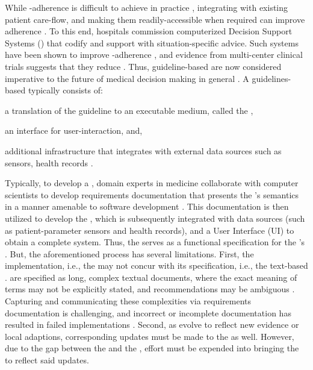 While \BPG{}-adherence is difficult to achieve in
practice \cite{RandJAMA99,DavisCMAJ97},
integrating \BPGs{} with existing patient care-flow,
and making them readily-accessible when required can improve adherence \cite{WoolfBMJ99}.
To this end, hospitals commission computerized Decision Support Systems (\CDSSs{})
that codify \BPGs{} and support \HCPs{} with situation-specific advice.
Such systems have been shown to improve \BPG{}-adherence \cite{GargJAMA06,KawamotoBMJ05}, and evidence from multi-center clinical trials
suggests that they reduce \PMEs{} \cite{BenettJAMIA16,SahotaJIS11}.
Thus, guideline-based \CDSSs{} are now considered imperative to the
future of medical decision making in general \cite{JamesNEJM01}.
A guidelines-based \CDSS{} typically consists of:
\begin{enumerate*}[label=(\roman*)]
  \item a translation of the guideline to an executable medium, called the
  \BPGLogic{},
  \item an interface for user-interaction, and,
  \item additional infrastructure that integrates with external data sources
  such as sensors, health records \cite{SuttonNature20}.
\end{enumerate*}
Typically, to develop a \CDSS{}, domain experts in medicine
collaborate with computer scientists to develop requirements documentation
that presents the \BPGs{}'s
semantics in a manner amenable to software development \cite{PelegJBI13}.
This documentation is then utilized to develop the \BPGLogic{}, which is subsequently integrated with data sources (such as patient-parameter sensors and health records),
and a User Interface (UI) to obtain a complete system. Thus, the \BPG{}
serves as a functional specification for the \CDSS{}'s \BPGLogic{}.
But, the aforementioned process has several limitations.
First, the implementation, i.e., the \BPGLogic{} may not concur with its specification,
i.e., the text-based \BPG{}. \BPGs{} are specified as long, complex textual documents,
where the exact meaning of terms may not be explicitly stated, and recommendations may be ambiguous \cite{ClerqAIM03}.
Capturing and communicating these complexities via requirements documentation
is challenging, and incorrect or incomplete documentation has resulted in failed
implementations \cite{KubbenBook19}. Second, as \BPGs{} evolve to reflect
new evidence or local adaptions, corresponding updates must be made to the
\CDSS{} as well. However, due to the gap between the \BPG{} and the \BPGLogic{},
effort must be expended into bringing the \BPGLogic{} to reflect said updates.

